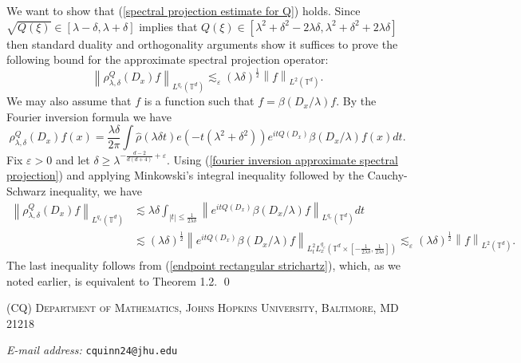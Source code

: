 \documentclass[11pt]{amsart}
\numberwithin{equation}{section}
\newcommand{\la}{\lambda}
\newcommand\norm[1]{\left\lVert#1\right\rVert}
\newcommand{\lpnorm}[3]{\norm{#1}_{L^{#2}(#3)}}
\newcommand{\mixlpnorm}[4]{\norm{#1}_{L^{#2}_{t} L^{#3}_{x}(#4)}}
\newcommand{\T}[1][]{\mathbb{T}^#1}
\begin{document}
We want to show that (\ref{spectral projection estimate for Q}) holds. Since $\sqrt{Q(\xi)} \in [\la - \delta, \la + \delta]$ implies that $Q(\xi) \in [\la^2 + \delta^2 - 2\la\delta, \la^2 + \delta^2 +  2\la\delta]$ then standard duality and orthogonality arguments show it suffices to prove the following bound for the approximate spectral projection operator:
\begin{equation}
    \lpnorm{\rho_{\la, \delta}^{Q}(D_x)f}{q_e}{\T{d}} \lesssim_{\varepsilon} (\la\delta)^{\frac{1}{2}}\lpnorm{f}{2}{\T{d}}.
\end{equation}
We may also assume that $f$ is a function such that $f = \beta(D_x / \la)f$. By the Fourier inversion formula we have
\begin{equation} \label{fourier inversion approximate spectral projection}
    \rho_{\la, \delta}^{Q}(D_x)f(x) = \frac{\la \delta}{2 \pi}\int\widehat{\rho}(\la \delta t)e(-t(\la^2 + \delta^2))e^{itQ(D_x)}\beta(D_x/\la)f(x)dt. 
\end{equation}
Fix $\varepsilon > 0$ and let $\delta \geq \la^{-\frac{d-2}{d(d+4)} + \varepsilon}$. Using (\ref{fourier inversion approximate spectral projection}) and applying Minkowski's integral inequality followed by the Cauchy-Schwarz inequality, we have
\begin{equation}
\begin{split}
    \lpnorm{\rho_{\la, \delta}^{Q}(D_x)f}{q_e}{\T{d}} &\lesssim \la \delta \int_{|t| \leq \frac{1}{2\la \delta}} \lpnorm{e^{itQ(D_x)}\beta(D_x/\la)f }{q_e}{\T{d}}dt \\
    &\lesssim (\la \delta)^{\frac{1}{2}}\mixlpnorm{e^{itQ(D_x)}\beta(D_x/\la)f}{2}{q_e}{\T{d}\times[-\frac{1}{2\la\delta},\frac{1}{2\la\delta}]} \lesssim_{\varepsilon} (\la \delta)^{\frac{1}{2}}\lpnorm{f}{2}{\T{d}}.
\end{split}
\end{equation}
The last inequality follows from (\ref{endpoint rectangular strichartz}), which, as we noted earlier, is equivalent to Theorem 1.2.
\qed

















\newcommand{\Addresses}{{%
  \bigskip
  \footnotesize

  (CQ) \textsc{Department of Mathematics, Johns Hopkins University,
    Baltimore, MD 21218}\par\nopagebreak
  \textit{E-mail address: }\texttt{cquinn24@jhu.edu}

  \medskip
}}


\Addresses 
\end{document}
